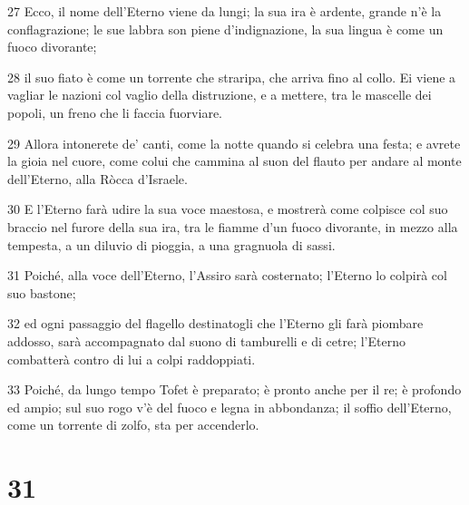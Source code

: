 \par 27 Ecco, il nome dell'Eterno viene da lungi; la sua ira è ardente, grande n'è la conflagrazione; le sue labbra son piene d'indignazione, la sua lingua è come un fuoco divorante;
\par 28 il suo fiato è come un torrente che straripa, che arriva fino al collo. Ei viene a vagliar le nazioni col vaglio della distruzione, e a mettere, tra le mascelle dei popoli, un freno che li faccia fuorviare.
\par 29 Allora intonerete de' canti, come la notte quando si celebra una festa; e avrete la gioia nel cuore, come colui che cammina al suon del flauto per andare al monte dell'Eterno, alla Ròcca d'Israele.
\par 30 E l'Eterno farà udire la sua voce maestosa, e mostrerà come colpisce col suo braccio nel furore della sua ira, tra le fiamme d'un fuoco divorante, in mezzo alla tempesta, a un diluvio di pioggia, a una gragnuola di sassi.
\par 31 Poiché, alla voce dell'Eterno, l'Assiro sarà costernato; l'Eterno lo colpirà col suo bastone;
\par 32 ed ogni passaggio del flagello destinatogli che l'Eterno gli farà piombare addosso, sarà accompagnato dal suono di tamburelli e di cetre; l'Eterno combatterà contro di lui a colpi raddoppiati.
\par 33 Poiché, da lungo tempo Tofet è preparato; è pronto anche per il re; è profondo ed ampio; sul suo rogo v'è del fuoco e legna in abbondanza; il soffio dell'Eterno, come un torrente di zolfo, sta per accenderlo.

\chapter{31}


